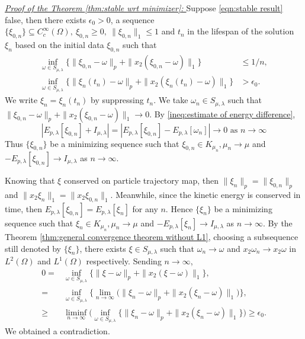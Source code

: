 \documentclass[11pt,letterpaper]{amsart}
\theoremstyle{definition}
\theoremstyle{remark}
\renewcommand{\O}{\Omega}
\numberwithin{equation}{section}
\begin{document}
\noindent\textit{\underline{Proof of the Theorem \ref{thm:stable wrt minimizer}: }}
Suppose \eqref{eqn:stable result} false, then there exists $\epsilon_0>0$, a sequence $\{\xi_{0,n}\}\subseteq C_c^\infty(\O), ~ \xi_{0,n} \geq 0, ~ \|\xi_{0,n}\|_1\leq 1 $ and $t_n$ in the lifespan of the solution $\xi_n$ based on the initial data $\xi_{0,n}$ such that 
\begin{align*}
    \inf_{\omega\in S_{\mu,\lambda}}\Big\{ \|\xi_{0,n}-\omega\|_{p}+\|x_2(\xi_{0,n}-\omega)\|_{1} \Big\} & \leq 1/n, \\ \inf_{\omega\in S_{\mu,\lambda}}\Big\{ \|\xi_n(t_n)-\omega\|_{p}+\|x_2(\xi_n(t_n)-\omega)\|_{1} \Big\} &> \epsilon_0.
\end{align*}
We write $\xi_n=\xi_n(t_n)$ by suppressing $t_n$. We take $\omega_n\in  S_{\mu,\lambda}$ such that $\|\xi_{0,n}-\omega\|_{p}+\|x_2(\xi_{0,n}-\omega)\|_{1}\rightarrow 0$. By \eqref{ineq:estimate of energy difference}, 
$$ | E_{p,\lambda}[\xi_{0,n}]+I_{\mu,\lambda} | = | E_{p,\lambda}[\xi_{0,n}]-E_{p,\lambda}[\omega_n] | \rightarrow 0 \text{ as } n \rightarrow \infty$$
Thus $\{\xi_{0,n}\}$ be a minimizing sequence such that $\xi_{0,n}\in K_{\mu_n}, \mu_n\rightarrow\mu$ and $-E_{p,\lambda}[\xi_{0,n}] \rightarrow I_{\mu,\lambda} $ as $n\rightarrow\infty$.

Knowing that $\xi$ conserved on particle trajectory map, then $\|\xi_n\|_{p}=\|\xi_{0,n}\|_{p}$ and $\|x_2\xi_n\|_1=\|x_2\xi_{0,n}\|_1$. Meanwhile, since the kinetic energy is conserved in time, then $E_{p,\lambda}[\xi_{0,n}]=E_{p,\lambda}[\xi_{n}]$ for any $n$. Hence $\{\xi_{n}\}$ be a minimizing sequence such that $\xi_{n}\in K_{\mu_n}, \mu_n\rightarrow\mu$ and $-E_{p,\lambda}[\xi_{n}] \rightarrow I_{\mu,\lambda} $ as $n\rightarrow\infty$. By the Theorem \ref{thm:general convergence theorem without L1}, choosing a subsequence still denoted by $\{\xi_{n}\}$, there exists $\xi\in S_{\mu,\lambda}$ such that $\omega_n\rightarrow\omega$ and $x_2\omega_n\rightarrow x_2\omega$ in $L^2(\Omega)$ and $L^1(\Omega)$ respectively. Sending $n\rightarrow\infty$, 
\begin{align*}
    0=&\inf_{\omega\in S_{\mu,\lambda}}\Big\{ \|\xi-\omega\|_{p}+\|x_2(\xi-\omega)\|_{1} \Big\},\\
    =&\inf_{\omega\in S_{\mu,\lambda}}\Big\{ \lim_{n\rightarrow\infty}\Big( \|\xi_{n}-\omega\|_{p}+\|x_2(\xi_{n}-\omega)\|_{1}\Big) \Big\},\\
    \geq&\liminf_{n\rightarrow\infty}\Big(\inf_{\omega\in S_{\mu,\lambda}}\Big\{ \|\xi_{n}-\omega\|_{p}+\|x_2(\xi_{n}-\omega)\|_{1}\Big\} \Big) 
    \geq \epsilon_0.
\end{align*}
We obtained a contradiction.
\end{document}
